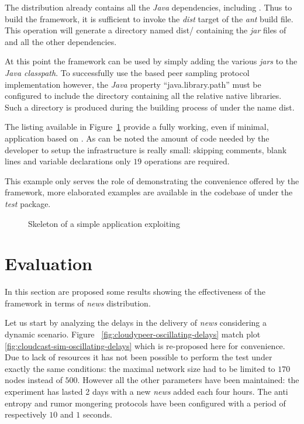 The distribution already contains all the \textit{Java} dependencies,
including \jgrapes. Thus to build the framework, it is sufficient to invoke the
\textit{dist} target of the \textit{ant} build file. This operation will
generate a directory named \textsf{dist/} containing the \textit{jar}
files of \cloudypeer and all the other dependencies.

At this point the framework can be used by simply adding the various
\textit{jars} to the \textit{Java classpath}. To successfully use the
\jgrapes based peer sampling protocol implementation however, the
\textit{Java} property ``java.library.path'' must be configured
to include the directory containing all the relative native
libraries. Such a directory is produced during the building process of
\jgrapes under the name \textsf{dist}.

The listing available in Figure~\ref{lst:cloudypeer-example-app}
provide a fully working, even if minimal, application based on \cloudypeer.
As can be noted the amount of code needed by the developer to setup
the \cloudcast infrastructure is really small: skipping comments,
blank lines and variable declarations only $19$ operations are
required.

This example only serves the role of demonstrating the convenience
offered by the framework, more elaborated examples are available in
the codebase of \cloudypeer under the \textit{test} package.

\begin{figure}[H]
  
  \hspace{-100pt}
  \caption{Skeleton of a simple application exploiting \cloudypeer}
  \label{lst:cloudypeer-example-app}
\end{figure}

\section{Evaluation}
In this section are proposed some results showing the
effectiveness of the framework in terms of \textit{news}
distribution.

Let us start by analyzing the delays in the delivery of \textit{news}
considering a dynamic scenario. Figure~
\ref{fig:cloudypeer-oscillating-delays} match plot~
\ref{fig:cloudcast-sim-oscillating-delays} which is re-proposed here
for convenience. Due to lack of resources it has not been possible to
perform the test under exactly the same conditions: the maximal network
size had to be limited to $170$ nodes instead of $500$. However all
the other parameters have been maintained: the experiment has lasted 2
days with a new
\textit{news} added each four hours. The anti entropy and
rumor mongering protocols have been configured with a period of
respectively $10$ and $1$ seconds.

